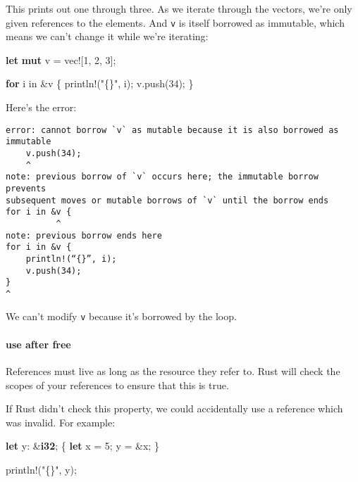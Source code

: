 \documentclass[a4paper,]{book}
\newenvironment{Shaded}{\begin{snugshade}}{\end{snugshade}}
\newcommand{\KeywordTok}[1]{\textcolor[rgb]{0.13,0.29,0.53}{\textbf{{#1}}}}
\newcommand{\DecValTok}[1]{\textcolor[rgb]{0.00,0.00,0.81}{{#1}}}
\newcommand{\StringTok}[1]{\textcolor[rgb]{0.31,0.60,0.02}{{#1}}}
\newcommand{\OtherTok}[1]{\textcolor[rgb]{0.56,0.35,0.01}{{#1}}}
\newcommand{\NormalTok}[1]{{#1}}
\begin{document}
This prints out one through three. As we iterate through the vectors,
we're only given references to the elements. And \texttt{v} is itself
borrowed as immutable, which means we can't change it while we're
iterating:

\begin{Shaded}
\begin{Highlighting}[]
\KeywordTok{let} \KeywordTok{mut} \NormalTok{v = }\OtherTok{vec!}\NormalTok{[}\DecValTok{1}\NormalTok{, }\DecValTok{2}\NormalTok{, }\DecValTok{3}\NormalTok{];}

\KeywordTok{for} \NormalTok{i in &v \{}
    \OtherTok{println!}\NormalTok{(}\StringTok{"\{\}"}\NormalTok{, i);}
    \NormalTok{v.push(}\DecValTok{34}\NormalTok{);}
\NormalTok{\}}
\end{Highlighting}
\end{Shaded}

Here's the error:

\begin{verbatim}
error: cannot borrow `v` as mutable because it is also borrowed as immutable
    v.push(34);
    ^
note: previous borrow of `v` occurs here; the immutable borrow prevents
subsequent moves or mutable borrows of `v` until the borrow ends
for i in &v {
          ^
note: previous borrow ends here
for i in &v {
    println!(“{}”, i);
    v.push(34);
}
^
\end{verbatim}

We can't modify \texttt{v} because it's borrowed by the loop.

\paragraph{use after free}\label{use-after-free}

References must live as long as the resource they refer to. Rust will
check the scopes of your references to ensure that this is true.

If Rust didn't check this property, we could accidentally use a
reference which was invalid. For example:

\begin{Shaded}
\begin{Highlighting}[]
\KeywordTok{let} \NormalTok{y: &}\KeywordTok{i32}\NormalTok{;}
\NormalTok{\{ }
    \KeywordTok{let} \NormalTok{x = }\DecValTok{5}\NormalTok{;}
    \NormalTok{y = &x;}
\NormalTok{\}}

\OtherTok{println!}\NormalTok{(}\StringTok{"\{\}"}\NormalTok{, y);}
\end{Highlighting}
\end{Shaded}
\end{document}
